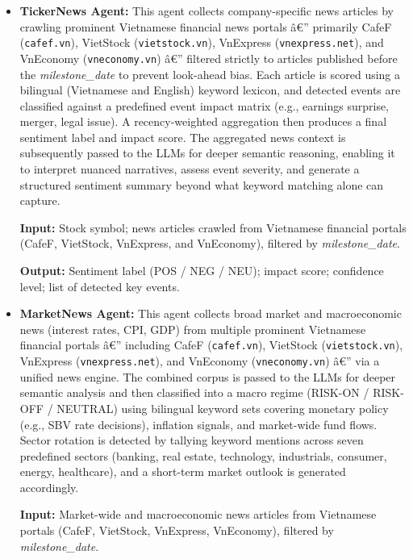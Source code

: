 \documentclass{ieeeaccess}
\begin{document}
\begin{itemize}
    \item \textbf{TickerNews Agent:}
    This agent collects company-specific news articles by crawling prominent Vietnamese financial
    news portals â€” primarily CafeF (\texttt{cafef.vn}), VietStock (\texttt{vietstock.vn}),
    VnExpress (\texttt{vnexpress.net}), and VnEconomy (\texttt{vneconomy.vn}) â€” filtered
    strictly to articles published before the \textit{milestone\_date} to prevent look-ahead bias.
    Each article is scored using a bilingual (Vietnamese and English) keyword lexicon, and
    detected events are classified against a predefined event impact matrix (e.g., earnings
    surprise, merger, legal issue). A recency-weighted aggregation then produces a final
    sentiment label and impact score. The aggregated news context is subsequently passed to the LLMs for deeper semantic reasoning, enabling it to interpret nuanced
    narratives, assess event severity, and generate a structured sentiment summary beyond
    what keyword matching alone can capture.

    \textbf{Input:} Stock symbol; news articles crawled from Vietnamese financial portals (CafeF,
    VietStock, VnExpress, and VnEconomy), filtered by \textit{milestone\_date}.

    \textbf{Output:} Sentiment label (POS / NEG / NEU); impact score; confidence level;
    list of detected key events.



    \item \textbf{MarketNews Agent:}
    This agent collects broad market and macroeconomic news (interest rates, CPI, GDP) from
    multiple prominent Vietnamese financial portals â€” including CafeF (\texttt{cafef.vn}),
    VietStock (\texttt{vietstock.vn}), VnExpress (\texttt{vnexpress.net}), and VnEconomy
    (\texttt{vneconomy.vn}) â€” via a unified news engine. The combined corpus is passed to the
    LLMs for deeper semantic analysis and then classified into a macro regime (RISK-ON / RISK-OFF
    / NEUTRAL) using bilingual keyword sets covering monetary policy (e.g., SBV rate decisions),
    inflation signals, and market-wide fund flows. Sector rotation is detected by tallying keyword
    mentions across seven predefined sectors (banking, real estate, technology, industrials,
    consumer, energy, healthcare), and a short-term market outlook is generated accordingly.

    \textbf{Input:} Market-wide and macroeconomic news articles from Vietnamese portals (CafeF,
    VietStock, VnExpress, VnEconomy), filtered by \textit{milestone\_date}.


\end{itemize}
\end{document}
